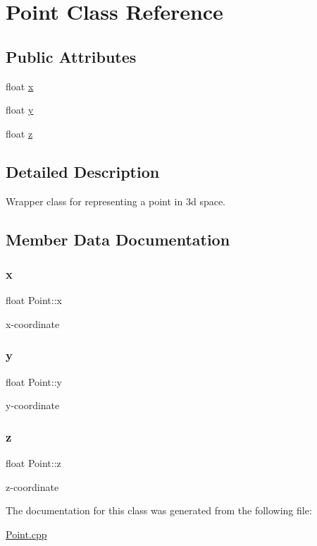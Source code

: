 \hypertarget{class_point}{}\section{Point Class Reference}
\label{class_point}
\subsection*{Public Attributes}
\begin{DoxyCompactItemize}
\item 
float \hyperlink{class_point_a05dfe2dfbde813ad234b514f30e662f1}{x}
\item 
float \hyperlink{class_point_a6101960c8d2d4e8ea1d32c9234bbeb8d}{y}
\item 
float \hyperlink{class_point_a9a666531e0e99adff132be93d2407d0c}{z}
\end{DoxyCompactItemize}


\subsection{Detailed Description}
Wrapper class for representing a point in 3d space. 

\subsection{Member Data Documentation}
\mbox{\label{class_point_a05dfe2dfbde813ad234b514f30e662f1}} 
\subsubsection{\texorpdfstring{x}{x}}
{\footnotesize\ttfamily float Point\+::x}

x-\/coordinate \mbox{\label{class_point_a6101960c8d2d4e8ea1d32c9234bbeb8d}} 
\subsubsection{\texorpdfstring{y}{y}}
{\footnotesize\ttfamily float Point\+::y}

y-\/coordinate \mbox{\label{class_point_a9a666531e0e99adff132be93d2407d0c}} 
\subsubsection{\texorpdfstring{z}{z}}
{\footnotesize\ttfamily float Point\+::z}

z-\/coordinate 

The documentation for this class was generated from the following file\+:\begin{DoxyCompactItemize}
\item 
\hyperlink{_point_8cpp}{Point.\+cpp}\end{DoxyCompactItemize}
